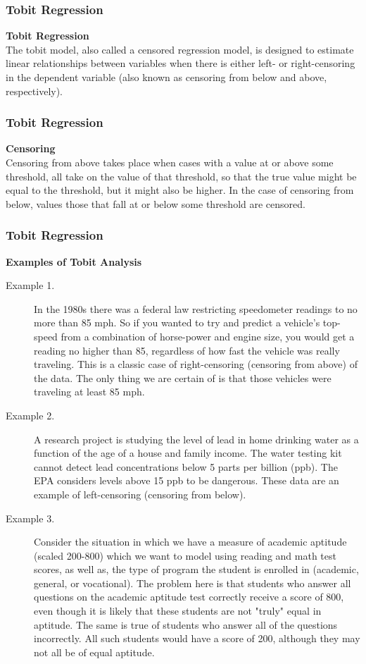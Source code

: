 \begin{frame}
\frametitle{Tobit Regression}
\textbf{Tobit Regression}\\
The tobit model, also called a censored regression model, is designed to estimate linear relationships between 
variables when there is either left- or right-censoring in the dependent variable (also known as censoring from below and 
above, respectively). 
\end{frame}
\begin{frame}
\frametitle{Tobit Regression}
\textbf{Censoring}\\
Censoring from above takes place when cases with a value at or above some threshold, all take on the value of 
that threshold, so that the true value might be equal to the threshold, but it might also be higher. 
In the case of censoring from below, values those that fall at or below some threshold are censored.
\end{frame}
\begin{frame}
\frametitle{Tobit Regression}
\textbf{Examples of Tobit Analysis}
\begin{description}
\item[ Example 1.] In the 1980s there was a federal law restricting speedometer readings to no more than 85 mph. So if you wanted to try and predict a vehicle's top-speed from a combination of horse-power and engine size, you would get a reading no higher than 85, regardless of how fast the vehicle was really traveling. This is a classic case of right-censoring (censoring from above) of the data. The only thing we are certain of is that those vehicles were traveling at least 85 mph.

\item[ Example 2.] A research project is studying the level of lead in home drinking water as a function of the age of a house and family income. The water testing kit cannot detect lead concentrations below 5 parts per billion (ppb). The EPA considers levels above 15 ppb to be dangerous. These data are an example of left-censoring (censoring from below).

\item[ Example 3.] Consider the situation in which we have a measure of academic aptitude (scaled 200-800) which we want to model using reading and math test scores, as well as, the type of program the student is enrolled in (academic, general, or vocational). The problem here is that students who answer all questions on the academic aptitude test correctly receive a score of 800, even though it is likely that these students are not "truly" equal in aptitude. The same is true of students who answer all of the questions incorrectly. All such students would have a score of 200, although they may not all be of equal aptitude.
\end{description}
\end{frame}
